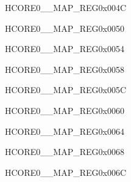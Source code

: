 \begin{register}{H}{CORE0\_\_MAP\_REG}{0x004C}\label{regdesc:CORE0LPSYSREGINTMAPREG}
\end{register}\vspace{-3em}

\begin{register}{H}{CORE0\_\_MAP\_REG}{0x0050}\label{regdesc:CORE0LPHUKINTMAPREG}
\end{register}\vspace{-3em}


\begin{register}{H}{CORE0\_\_MAP\_REG}{0x0054}\label{regdesc:CORE0SYSICMINTMAPREG}
\end{register}\vspace{-3em}


\begin{register}{H}{CORE0\_\_MAP\_REG}{0x0058}\label{regdesc:CORE0USBDEVICEINTMAPREG}
\end{register}\vspace{-3em}


\begin{register}{H}{CORE0\_\_MAP\_REG}{0x005C}\label{regdesc:CORE0SDIOHOSTINTMAPREG}
\end{register}\vspace{-3em}


\begin{register}{H}{CORE0\_\_MAP\_REG}{0x0060}\label{regdesc:CORE0AXIDMACINTMAPREG}
\end{register}\vspace{-3em}


\begin{register}{H}{CORE0\_\_MAP\_REG}{0x0064}\label{regdesc:CORE0SPI2INTMAPREG}
\end{register}\vspace{-3em}


\begin{register}{H}{CORE0\_\_MAP\_REG}{0x0068}\label{regdesc:CORE0SPI3INTMAPREG}
\end{register}\vspace{-3em}


\begin{register}{H}{CORE0\_\_MAP\_REG}{0x006C}\label{regdesc:CORE0I2S0INTMAPREG}
\end{register}\vspace{-3em}


